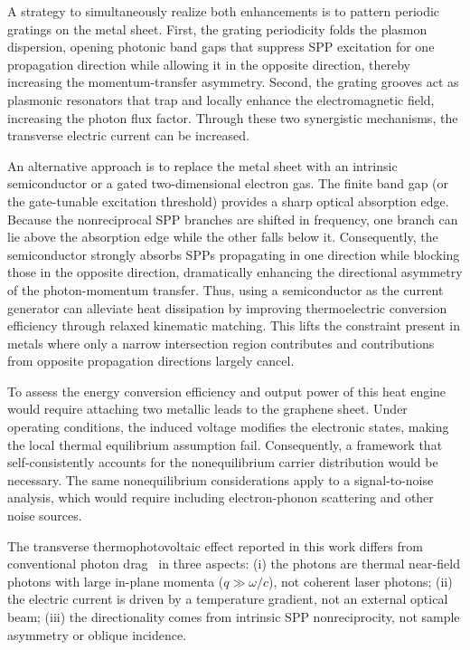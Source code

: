 \documentclass[aps,prl,twocolumn,longbibliography]{revtex4-2}
\begin{document}
A strategy to simultaneously realize both enhancements is to pattern periodic gratings on
the metal sheet. First, the grating periodicity folds the plasmon dispersion, opening
photonic band gaps that suppress SPP excitation for one propagation direction while
allowing it in the opposite direction, thereby increasing the momentum-transfer asymmetry.
Second, the grating grooves act as plasmonic resonators that trap and locally enhance the
electromagnetic field, increasing the photon flux factor. Through these two synergistic
mechanisms, the transverse electric current can be increased.

An alternative approach is to replace the metal sheet with an intrinsic semiconductor or a
gated two-dimensional electron gas. The finite band gap (or the gate-tunable excitation
threshold) provides a sharp optical absorption edge. Because the nonreciprocal SPP
branches are shifted in frequency, one branch can lie above the absorption edge while the
other falls below it. Consequently, the semiconductor strongly absorbs SPPs propagating in
one direction while blocking those in the opposite direction, dramatically enhancing the
directional asymmetry of the photon-momentum transfer.
Thus, using a semiconductor as the current generator can alleviate heat dissipation by
improving thermoelectric conversion efficiency through relaxed kinematic matching.
This lifts the constraint present in metals where only a narrow intersection region
contributes and contributions from opposite propagation directions largely cancel.

To assess the energy conversion efficiency and output power of this heat engine would
require attaching two metallic leads to the graphene sheet. Under operating conditions,
the induced voltage modifies the electronic states, making the local thermal equilibrium
assumption fail. Consequently, a framework that self-consistently accounts for the
nonequilibrium carrier distribution would be necessary.
The same nonequilibrium considerations apply to a signal-to-noise analysis, which would
require including electron-phonon scattering and other noise sources.

The transverse thermophotovoltaic effect reported in this work differs from conventional
photon drag~\cite{photon_drag88, photon_drag19, photon_drag24, photon_drag25} in three
aspects: (i) the photons are thermal near-field photons with large in-plane momenta ($q\gg
\omega/c$), not coherent laser photons; (ii) the electric current is driven by a
temperature gradient, not an external optical beam; (iii) the directionality comes from
intrinsic SPP nonreciprocity, not sample asymmetry or oblique incidence.
\end{document}
